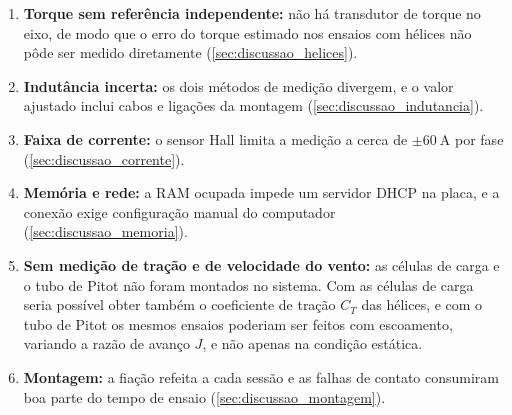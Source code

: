 \begin{enumerate}
    \item \textbf{Torque sem referência independente:} não há transdutor de
    torque no eixo, de modo que o erro do torque estimado nos ensaios com
    hélices não pôde ser medido diretamente
    (\autoref{sec:discussao_helices}).
    \item \textbf{Indutância incerta:} os dois métodos de medição divergem, e o
    valor ajustado inclui cabos e ligações da montagem
    (\autoref{sec:discussao_indutancia}).
    \item \textbf{Faixa de corrente:} o sensor Hall limita a medição a cerca de
    $\pm\SI{60}{\ampere}$ por fase (\autoref{sec:discussao_corrente}).
    \item \textbf{Memória e rede:} a RAM ocupada impede um servidor DHCP na
    placa, e a conexão exige configuração manual do computador
    (\autoref{sec:discussao_memoria}).
    \item \textbf{Sem medição de tração e de velocidade do vento:} as células
    de carga e o tubo de Pitot não foram montados no sistema. Com as células
    de carga seria possível obter também o coeficiente de tração $C_T$ das
    hélices, e com o tubo de Pitot os mesmos ensaios poderiam ser feitos com
    escoamento, variando a razão de avanço $J$, e não apenas na condição
    estática.
    \item \textbf{Montagem:} a fiação refeita a cada sessão e as falhas de
    contato consumiram boa parte do tempo de ensaio
    (\autoref{sec:discussao_montagem}).
\end{enumerate}
